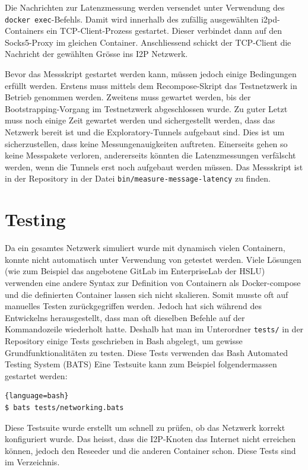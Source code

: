 Die Nachrichten zur Latenzmessung werden versendet unter Verwendung des \lstinline|docker exec|-Befehls.
Damit wird innerhalb des zufällig ausgewählten i2pd-Containers ein TCP-Client-Prozess gestartet.
Dieser verbindet dann auf den Socks5-Proxy im gleichen Container.
Anschliessend schickt der TCP-Client die Nachricht der gewählten Grösse ins I2P Netzwerk.

Bevor das Messskript gestartet werden kann, müssen jedoch einige Bedingungen erfüllt werden.
Erstens muss mittels dem Recompose-Skript das Testnetzwerk in Betrieb genommen werden.
Zweitens muss gewartet werden, bis der Bootstrapping-Vorgang im Testnetzwerk abgeschlossen wurde.
Zu guter Letzt muss noch einige Zeit gewartet werden und sichergestellt werden, dass das Netzwerk bereit ist und die Exploratory-Tunnels aufgebaut sind.
Dies ist um sicherzustellen, dass keine Messungenauigkeiten auftreten.
Einerseits gehen so keine Messpakete verloren, andererseits könnten die Latenzmessungen verfälscht werden, wenn die Tunnels erst noch aufgebaut werden müssen.
Das Messskript ist in der Repository in der Datei \lstinline|bin/measure-message-latency| zu finden.

\section{Testing}

Da ein gesamtes Netzwerk simuliert wurde mit dynamisch vielen Containern, konnte nicht automatisch unter Verwendung von  getestet werden.
Viele  Lösungen (wie zum Beispiel das angebotene GitLab im EnterpriseLab der HSLU) verwenden eine andere Syntax zur Definition von Containern als Docker-compose und die definierten Container lassen sich nicht skalieren.
Somit musste oft auf manuelles Testen zurückgegriffen werden.
Jedoch hat sich während des Entwickelns herausgestellt, dass man oft dieselben Befehle auf der Kommandozeile wiederholt hatte.
Deshalb hat man im Unterordner
\lstinline|tests/| in der Repository einige Tests geschrieben in Bash abgelegt, um gewisse Grundfunktionalitäten zu testen.
Diese Tests verwenden das Bash Automated Testing System (BATS)
Eine Testsuite kann zum Beispiel folgendermassen gestartet werden:

\begin{lstlisting}[numbers=none]{language=bash}
$ bats tests/networking.bats
\end{lstlisting}

Diese Testsuite wurde erstellt um schnell zu prüfen, ob das Netzwerk korrekt konfiguriert wurde. Das heisst, dass die I2P-Knoten das Internet nicht erreichen können, jedoch den Reseeder und die anderen Container schon.
Diese Tests sind im Verzeichnis.

